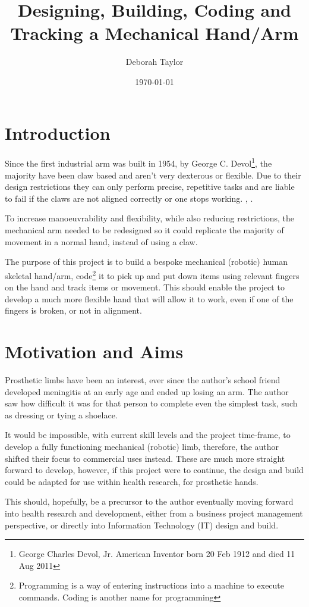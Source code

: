 \documentclass[progress]{cmpreport}
\title{Designing, Building, Coding and Tracking a Mechanical Hand/Arm}
\author{Deborah Taylor}
\date{\today}
\begin{document}
\section{Introduction}
Since the first industrial arm was built in 1954, by George C. Devol\footnote{George Charles Devol, Jr. American Inventor born 20 Feb 1912 and died 11 Aug 2011}, the majority have been claw based and aren't very dexterous or flexible. Due to their design restrictions they can only perform precise, repetitive tasks and are liable to fail if the claws are not aligned correctly or one stops working. \citep{devol}, \citep{grigorediscovering}.  

To increase manoeuvrability and flexibility, while also reducing restrictions, the mechanical arm needed to be redesigned so it could replicate the majority of movement in a normal hand, instead of using a claw. 

The purpose of this project is to build a bespoke mechanical (robotic) human skeletal hand/arm, code\footnote{Programming is a way of entering instructions into a machine to execute commands. Coding is another name for programming} it to pick up and put down items using relevant fingers on the hand and track items or movement. This should enable the project to develop a much more flexible hand that will allow it to work, even if one of the fingers is broken, or not in alignment. 


\section{Motivation and Aims}
Prosthetic limbs have been an interest, ever since the author's school friend developed meningitis at an early age and ended up losing an arm. The author saw how difficult it was for that person to complete even the simplest task, such as dressing or tying a shoelace. 

It would be impossible, with current skill levels and the project time-frame, to develop a fully functioning mechanical (robotic) limb, therefore, the author shifted their focus to commercial uses instead. These are much more straight forward to develop, however, if this project were to continue, the design and build could be adapted for use within health research, for prosthetic hands.

This should, hopefully, be a precursor to the author eventually moving forward into health research and development, either from a business project management perspective, or directly into Information Technology (IT) design and build.
\end{document}
